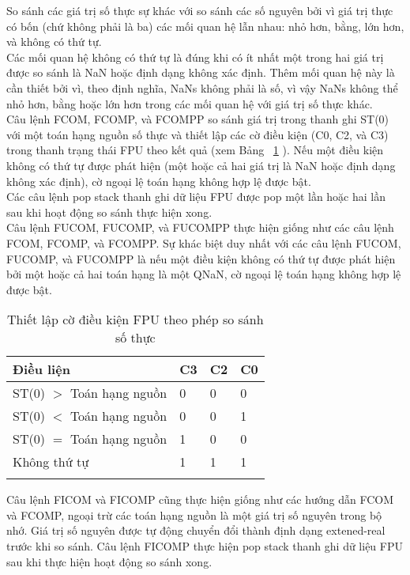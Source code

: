 		So sánh các giá trị số thực sự khác với so sánh các số nguyên bởi vì giá trị thực có bốn (chứ không phải là ba) các mối quan hệ lẫn nhau: nhỏ hơn, bằng, lớn hơn, và không có thứ tự.\\
		
		Các mối quan hệ không có thứ tự là đúng khi có ít nhất một trong hai giá trị được so sánh là NaN hoặc định dạng không xác định. Thêm mối quan hệ này là cần thiết bởi vì, theo định nghĩa, NaNs không phải là số, vì vậy NaNs không thể nhỏ hơn, bằng hoặc lớn hơn trong các mối quan hệ với giá trị số thực khác.\\
		
		Câu lệnh FCOM, FCOMP, và FCOMPP so sánh giá trị trong thanh ghi ST(0) với một toán hạng nguồn số thực và thiết lập các cờ điều kiện (C0, C2, và C3) trong thanh trạng thái FPU theo kết quả (xem Bảng ~\ref{tb:SettingFPU} ). Nếu một điều kiện không có thứ tự được phát hiện (một hoặc cả hai giá trị là NaN hoặc định dạng không xác định), cờ ngoại lệ toán hạng không hợp lệ được bật.\\
		
		Các câu lệnh pop stack thanh ghi dữ liệu FPU được pop một lần hoặc hai lần sau khi hoạt động so sánh thực hiện xong.\\
		
		Câu lệnh FUCOM, FUCOMP, và FUCOMPP thực hiện giống như các câu lệnh FCOM, FCOMP, và FCOMPP. Sự khác biệt duy nhất với các câu lệnh FUCOM, FUCOMP, và FUCOMPP là nếu một điều kiện không có thứ tự được phát hiện bởi một hoặc cả hai toán hạng là một QNaN, cờ ngoại lệ toán hạng không hợp lệ được bật.
		\begin{longtable}{|l|l|l|l|}
			\hline
				Điều liện	& C3 & C2 & C0 \\
			\hline
			\hline
				ST(0) $>$ Toán hạng nguồn & 0 &  0 &  0 \\
			\hline
				ST(0) $<$ Toán hạng nguồn & 0 &  0 &  1 \\
			\hline
				ST(0) $=$ Toán hạng nguồn & 1 &  0 &  0 \\
			\hline
				Không thứ tự & 1 &  1 &  1 \\
			\hline
				\caption{Thiết lập cờ điều kiện FPU theo phép so sánh số thực}
				\label{tb:SettingFPU}
		\end{longtable}	
		
		Câu lệnh FICOM và FICOMP cũng thực hiện giống như các hướng dẫn FCOM và FCOMP, ngoại trừ các toán hạng nguồn là một giá trị số nguyên trong bộ nhớ. Giá trị số nguyên được tự động chuyển đổi thành định dạng extened-real trước khi so sánh. Câu lệnh FICOMP thực hiện pop stack thanh ghi dữ liệu FPU sau khi thực hiện hoạt động so sánh xong.\\
		
